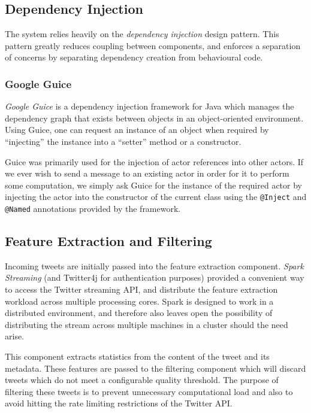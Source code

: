 \documentclass{l4proj}
\newcommand{\code}[1]{\texttt{#1}}
\begin{document}
        \subsection{Dependency Injection}
        
        The system relies heavily on the \textit{dependency injection} design pattern. This pattern greatly reduces coupling between components, and enforces a separation of concerns by separating dependency creation from behavioural code.
        
            \subsubsection{Google Guice}
                
        \textit{Google Guice} is a dependency injection framework for Java which manages the dependency graph that exists between objects in an object-oriented environment. Using Guice, one can request an instance of an object when required by ``injecting'' the instance into a ``setter'' method or a constructor.

Guice was primarily used for the injection of actor references into other actors. If we ever wish to send a message to an existing actor in order for it to perform some computation, we simply ask Guice for the instance of the required actor by injecting the actor into the constructor of the current class using the \code{@Inject} and \code{@Named} annotations provided by the framework.

        
        \subsection{Feature Extraction and Filtering}
        Incoming tweets are initially passed into the feature extraction component. \textit{Spark Streaming} (and Twitter4j for authentication purposes) provided a convenient way to access the Twitter streaming API, and distribute the feature extraction workload across multiple processing cores. Spark is designed to work in a distributed environment, and therefore also leaves open the possibility of distributing the stream across multiple machines in a cluster should the need arise.
        
        This component extracts statistics from the content of the tweet and its metadata. These features are passed to the filtering component which will discard tweets which do not meet a configurable quality threshold. The purpose of filtering these tweets is to prevent unnecessary computational load and also to avoid hitting the rate limiting restrictions of the Twitter API.
        
\end{document}
